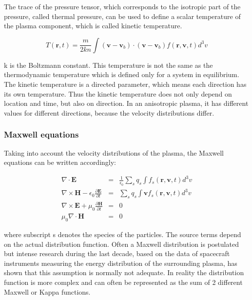 \documentclass[a4paper,11pt]{thesis}
\begin{document}
The trace of the pressure tensor, which corresponds to the isotropic
part of the pressure, called thermal pressure, can be used to define a scalar temperature of the plasma component, which is called
kinetic temperature.

\begin{equation}\label{kinetic_temperature}
T(\mathbf{r},t)=\frac{m}{2kn}\int (\mathbf{v}-\mathbf{v}_b) \cdot
(\mathbf{v}-\mathbf{v}_b) f(\mathbf{r,v},t)d^3v \end{equation}

k is the Boltzmann constant. This temperature is not the same as the thermodynamic temperature which is defined only for a system in equilibrium. The kinetic temperature is a directed parameter, which means each direction has its own temperature. Thus the kinetic temperature does not only depend on location and time, but also on direction. In an anisotropic plasma, it has different values for different directions, because the velocity distributions differ.

\subsubsection{Maxwell equations}
Taking into account the velocity distributions of the plasma, the Maxwell equations can be written accordingly:

\begin{eqnarray}
  \nabla \cdot \mathbf{E} &=& \frac{1}{\epsilon_0}\sum_s q_s \int f_s(\mathbf{r,v},t)d^3v \\
\nabla \times \mathbf{H}- \epsilon_0 \frac{\partial \mathbf{E}}{\partial t}&=& \sum_s q_s \int
 \mathbf{v} f_s(\mathbf{r,v},t)d^3v \\
\nabla \times \mathbf{E} + \mu_0 \frac{ \partial \mathbf{H}}{\partial t} &=& 0 \\
\mu_0 \nabla \cdot \mathbf{H} &=& 0
\end{eqnarray}

where subscript s denotes the species of the particles. The source terms depend on the actual distribution function.
 Often a Maxwell distribution is postulated but intense research during the last decade, based on the data of spacecraft instruments measuring the energy distribution of the surrounding plasma, has shown that this assumption is normally not
 adequate. In reality the distribution function is more
 complex and can often be represented as the sum of 2 different Maxwell or Kappa functions.
\end{document}

